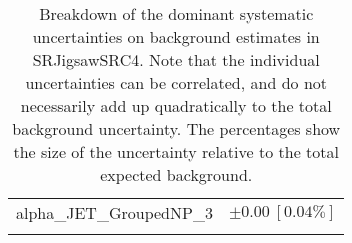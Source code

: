 \begin{table}
\begin{center}
\begin{tabular*}{\textwidth}{@{\extracolsep{\fill}}lc}
alpha\_JET\_GroupedNP\_3         & $\pm 0.00\ [0.04\%] $       \\
\noalign{\smallskip}\hline\noalign{\smallskip}
\end{tabular*}
\end{center}
\caption[Breakdown of uncertainty on background estimates]{
Breakdown of the dominant systematic uncertainties on background estimates in SRJigsawSRC4.
Note that the individual uncertainties can be correlated, and do not necessarily add up quadratically to 
the total background uncertainty. The percentages show the size of the uncertainty relative to the total expected background.
\label{table.results.bkgestimate.uncertainties.SRJigsawSRC4}}
\end{table}
%